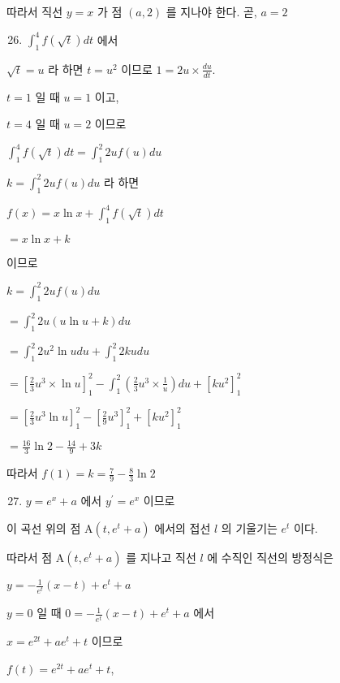 \documentclass[10pt]{article}
\begin{document}
따라서 직선 \(y=x\) 가 점 \((a, 2)\) 를 지나야 한다. 곧, \(a=2\)

\begin{enumerate}
  \setcounter{enumi}{25}
  \item \(\int_{1}^{4} f(\sqrt{t}) d t\) 에서
\end{enumerate}

\(\sqrt{t}=u\) 라 하면 \(t=u^{2}\) 이므로 \(1=2 u \times \frac{d u}{d t}\).

\(t=1\) 일 때 \(u=1\) 이고,

\(t=4\) 일 때 \(u=2\) 이므로

\(\int_{1}^{4} f(\sqrt{t}) d t=\int_{1}^{2} 2 u f(u) d u\)

\(k=\int_{1}^{2} 2 u f(u) d u\) 라 하면

\(f(x)=x \ln x+\int_{1}^{4} f(\sqrt{t}) d t\)

\(=x \ln x+k\)

이므로

\(k=\int_{1}^{2} 2 u f(u) d u\)

\(=\int_{1}^{2} 2 u(u \ln u+k) d u\)

\(=\int_{1}^{2} 2 u^{2} \ln u d u+\int_{1}^{2} 2 k u d u\)

\(=\left[\frac{2}{3} u^{3} \times \ln u\right]_{1}^{2}-\int_{1}^{2}\left(\frac{2}{3} u^{3} \times \frac{1}{u}\right) d u+\left[k u^{2}\right]_{1}^{2}\)

\(=\left[\frac{2}{3} u^{3} \ln u\right]_{1}^{2}-\left[\frac{2}{9} u^{3}\right]_{1}^{2}+\left[k u^{2}\right]_{1}^{2}\)

\(=\frac{16}{3} \ln 2-\frac{14}{9}+3 k\)

따라서 \(f(1)=k=\frac{7}{9}-\frac{8}{3} \ln 2\)

\begin{enumerate}
  \setcounter{enumi}{26}
  \item \(y=e^{x}+a\) 에서 \(y^{\prime}=e^{x}\) 이므로
\end{enumerate}

이 곡선 위의 점 \(\mathrm{A}\left(t, e^{t}+a\right)\) 에서의 접선 \(l\) 의 기울기는 \(e^{t}\) 이다.

따라서 점 \(\mathrm{A}\left(t, e^{t}+a\right)\) 를 지나고 직선 \(l\) 에 수직인 직선의 방정식은

\(y=-\frac{1}{e^{t}}(x-t)+e^{t}+a\)

\(y=0\) 일 때 \(0=-\frac{1}{e^{t}}(x-t)+e^{t}+a\) 에서

\(x=e^{2 t}+a e^{t}+t\) 이므로

\(f(t)=e^{2 t}+a e^{t}+t\),
\end{document}
